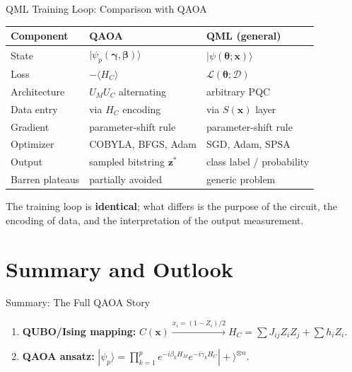 \documentclass{beamer}
\begin{document}
\begin{frame}

\begin{frame}{QML Training Loop: Comparison with QAOA}
\begin{center}
\small
\begin{tabular}{lll}
\hline
\textbf{Component} & \textbf{QAOA} & \textbf{QML (general)} \\
\hline
State & $|\psi_p(\boldsymbol{\gamma},\boldsymbol{\beta})\rangle$ &
  $|\psi(\boldsymbol{\theta};\mathbf{x})\rangle$ \\
Loss & $-\langle H_C\rangle$ & $\mathcal{L}(\boldsymbol{\theta};\mathcal{D})$ \\
Architecture & $U_M U_C$ alternating & arbitrary PQC \\
Data entry & via $H_C$ encoding & via $S(\mathbf{x})$ layer \\
Gradient & parameter-shift rule & parameter-shift rule \\
Optimizer & COBYLA, BFGS, Adam & SGD, Adam, SPSA \\
Output & sampled bitstring $\mathbf{z}^*$ & class label / probability \\
Barren plateaus & partially avoided & generic problem \\
\hline
\end{tabular}
\end{center}

\medskip

The training loop is \textbf{identical}; what differs is the
purpose of the circuit, the encoding of data, and the
interpretation of the output measurement.
\end{frame}

\section{Summary and Outlook}

\begin{frame}{Summary: The Full QAOA Story}
\begin{enumerate}
\item \textbf{QUBO/Ising mapping:}
  $C(\mathbf{x}) \xrightarrow{x_i=(1-Z_i)/2} H_C = \sum J_{ij}Z_iZ_j + \sum h_iZ_i$.

\item \textbf{QAOA ansatz:}
  $|\psi_p\rangle = \prod_{k=1}^p e^{-i\beta_k H_M}e^{-i\gamma_k H_C}|+\rangle^{\otimes n}$.


\end{enumerate}
\end{frame}
\end{frame}
\end{document}

